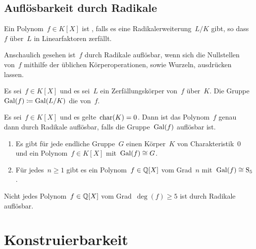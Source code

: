 \subsection{Auflösbarkeit durch Radikale}

\begin{definition}
  Ein Polynom~$f \in K[X]$ ist , falls es eine Radikalerweiterung~$L/K$ gibt, so dass~$f$ über~$L$ in Linearfaktoren zerfällt. 
\end{definition}

Anschaulich gesehen ist~$f$ durch Radikale auflösbar, wenn sich die Nullstellen von~$f$ mithilfe der üblichen Körperoperationen, sowie Wurzeln, ausdrücken lassen. 

\begin{definition}
  Es sei~$f \in K[X]$ und es sei~$L$ ein Zerfällungskörper von~$f$ über~$K$.
  Die Gruppe~$\operatorname{Gal}(f) \coloneqq \operatorname{Gal}(L/K)$ die  von~$f$.
\end{definition}

\begin{theorem}
  Es sei~$f \in K[X]$ und es gelte~$\operatorname{char}(K) = 0$.
  Dann ist das Polynom~$f$ genau dann durch Radikale auflösbar, falls die Gruppe~$\operatorname{Gal}(f)$ auflösbar ist.
\end{theorem}

\begin{lemma}
  \leavevmode
  \begin{enumerate}
    \item
      Es gibt für jede endliche Gruppe~$G$ einen Körper~$K$ von Charakteristik~$0$ und ein Polynom~$f \in K[X]$ mit~$\operatorname{Gal}(f) \cong G$.
    \item
      Für jedes~$n \geq 1$ gibt es ein Polynom~$f \in \mathbb{Q}[X]$ vom Grad~$n$ mit~$\operatorname{Gal}(f) \cong \operatorname{S}_5$.
  \end{enumerate}
\end{lemma}

\begin{theorem}
  Nicht jedes Polynom~$f \in \mathbb{Q}[X]$ vom Grad~$\deg(f) \geq 5$ ist durch Radikale auflösbar.
\end{theorem}





\section{Konstruierbarkeit}



